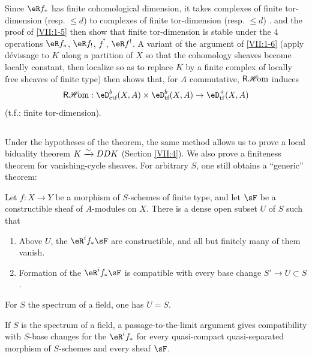 Since $\eR f_\ast$ has finite cohomological dimension, it takes complexes of
finite tor-dimension (resp. $\leqslant d$) to complexes of finite
tor-dimension (resp. $\leqslant d$) \cite[XVII 5.2.11]{sga4}.
\cite[XVII 5.2.10]{sga4} and the proof of \ref{VII:1-5} then show that finite
tor-dimension is stable under the $4$ operations $\eR f_\ast$,
$\eR f_!$, $f^\ast$, $\eR f^!$. A variant of the argument of
\ref{VII:1-6} (apply dévissage to $K$ along a partition of $X$ so that the
cohomology sheaves become locally constant, then localize so as to replace $K$
by a finite complex of locally free sheaves of finite type) then shows that,
for $A$ commutative, $\operatorname{\mathsf{R}\mathscr{H}\!om}$ induces
\[
  \rHom:\eD_\text{ctf}^b(X,A)\times \eD_\text{tf}^b(X,A) \to \eD_\text{tf}^+(X,A)
\]
(t.f.: finite tor-dimension).






\subsection{}\label{VII:1-8}

Under the hypotheses of the theorem, the same method allows us to prove a
local biduality theorem $K\xrightarrow\sim D D K$ (Section \ref{VII:4}). We also prove a
finiteness theorem for vanishing-cycle sheaves. For arbitrary $S$, one still
obtains a ``generic'' theorem:






\begin{theorem_}\label{VII:1-9}
Let $f:X\to Y$ be a morphism of $S$-schemes of finite type, and let $\sF$ be
a constructible sheaf of $A$-modules on $X$. There is a dense open subset
$U$ of $S$ such that
\begin{enumerate}[\indent (i)]
  \item Above $U$, the $\eR^i f_\ast \sF$ are constructible, and all but
    finitely many of them vanish.
  \item Formation of the $\eR^i f_\ast \sF$ is compatible with every base
    change $S' \to U\subset S$.
\end{enumerate}
\end{theorem_}

For $S$ the spectrum of a field, one has $U=S$.

If $S$ is the spectrum of a field, a passage-to-the-limit argument gives
compatibility with $S$-base changes for the $\eR^i f_\ast$ for every
quasi-compact quasi-separated morphism of $S$-schemes and every sheaf $\sF$.






